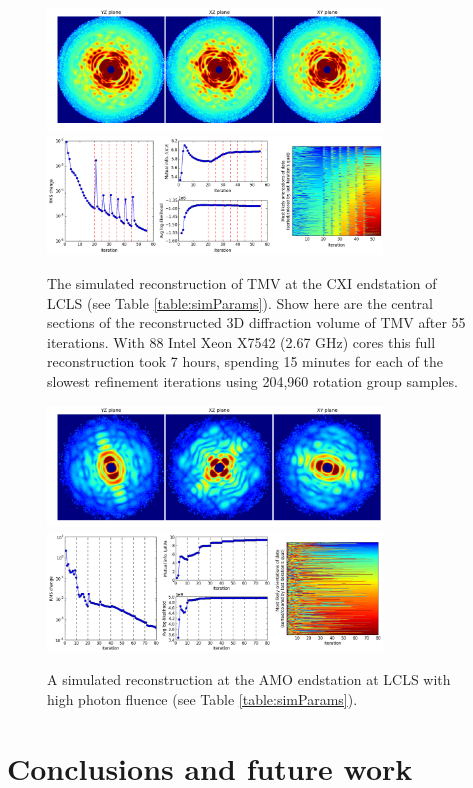 \documentclass[]{iucr}              %
\begin{document}
\begin{figure}
\caption{The simulated reconstruction of TMV at the CXI endstation of LCLS (see Table \ref{table:simParams}). Show here are the central sections of the reconstructed 3D diffraction volume of TMV after 55 iterations. With 88 Intel Xeon X7542 (2.67 GHz) cores this full reconstruction took 7 hours, spending 15 minutes for each of the slowest refinement iterations using 204,960 rotation group samples.}
\includegraphics[width=3.5in]{figures/cxi_intens_055.png} \label{fig:cxi_intens}
\includegraphics[width=3.5in]{figures/cxi_log_fig.png} \label{fig:cxi_log}
\end{figure}

\begin{figure}
\caption{A simulated reconstruction at the AMO endstation at LCLS with high photon fluence (see Table \ref{table:simParams}).}
\includegraphics[width=3.5in]{figures/amo_high_intens.png} \label{fig:amo_high_intens}
\includegraphics[width=3.5in]{figures/amo_high_log.png} \label{fig:amo_high_log}
\end{figure}


\section{Conclusions and future work}
\end{document}
